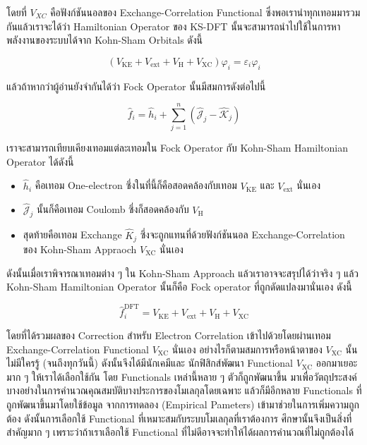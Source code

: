 \noindent โดยที่ $V_{X C}$ คือฟังก์ชันนอลของ Exchange-Correlation Functional ซึ่งพอเรานำทุกเทอมมารวมกันแล้วเราจะได้ว่า
Hamiltonian Operator ของ KS-DFT นั้นจะสามารถนำไปใช้ในการหาพลังงานของระบบได้จาก Kohn-Sham Orbitals ดังนี้

\begin{equation}
    \label{eq:Kohn_Sham_Equation}
    \left(
    V_{\mathrm{KE}}
    + V_{\mathrm{ext}}
    + V_{\mathrm{H}}
    + V_{\mathrm{XC}}
    \right)
    \varphi_i
    =
    \varepsilon_i \varphi_i
\end{equation}

\noindent แล้วถ้าหากว่าผู้อ่านยังจำกันได้ว่า Fock Operator นั้นมีสมการดังต่อไปนี้

\begin{equation}
    \hat{f}_i
    =
    \hat{h}_i + \sum_{j=1}^n \left(\hat{\mathscr{J}}_j - \hat{\mathscr{K}}_j\right)
\end{equation}

\noindent เราจะสามารถเทียบเคียงเทอมแต่ละเทอมใน Fock Operator กับ Kohn-Sham Hamiltonian Operator ได้ดังนี้

\begin{itemize}[topsep=0pt,noitemsep]
    \setlength\itemsep{1em}
    \item $\hat{h}_i$ คือเทอม One-electron ซึ่งในที่นี้ก็คือสอดคล้องกับเทอม $V_{\mathrm{KE}}$ และ $V_{\mathrm{ext}}$ นั่นเอง

    \item $\hat{\mathcal{J}}_j$ นั้นก็คือเทอม Coulomb ซึ่งก็สอดคล้องกับ $V_{\mathrm{H}}$

    \item สุดท้ายคือเทอม Exchange $\hat{K}_j$ ซึ่งจะถูกแทนที่ด้วยฟังก์ชันนอล Exchange-Correlation ของ Kohn-Sham Appraoch
          $V_{\mathrm{XC}}$ นั่นเอง
\end{itemize}

ดังนั้นเมื่อเราพิจารณาเทอมต่าง ๆ ใน Kohn-Sham Approach แล้วเราอาจจะสรุปได้ว่าจริง ๆ แล้ว Kohn-Sham Hamiltonian Operator นั้นก็คือ
Fock operator ที่ถูกดัดแปลงมานั่นเอง ดังนี้

\begin{equation}
    \hat{f}_i^{\mathrm{DFT}}
    =
    V_{\mathrm{KE}}
    + V_{\mathrm{ext}}
    + V_{\mathrm{H}}
    + V_{\mathrm{XC}}
\end{equation}

\noindent โดยที่ได้รวมผลของ Correction สำหรับ Electron Correlation เข้าไปด้วยโดยผ่านเทอม Exchange-Correlation Functional
$V_{\mathrm{XC}}$ นั่นเอง อย่างไรก็ตามสมการหรือหน้าตาของ $V_{\mathrm{XC}}$ นั้นไม่มีใครรู้ (จนถึงทุกวันนี้) ดังนั้นจึงได้มีนักเคมีและ%
นักฟิสิกส์พัฒนา Functional $V_{\mathrm{XC}}$ ออกมาเยอะมาก ๆ ให้เราได้เลือกใช้กัน โดย Functionals เหล่านี้หลาย ๆ ตัวก็ถูกพัฒนาขึ้น%
มาเพื่อวัตถุประสงค์บางอย่างในการคำนวณคุณสมบัติบางประการของโมเลกุลโดยเฉพาะ แล้วก็มีอีกหลาย Functionals ที่ถูกพัฒนาขึ้นมาโดยใช้ข้อมูล%
จากการทดลอง (Empirical Pameters) เข้ามาช่วยในการเพิ่มความถูกต้อง ดังนั้นการเลือกใช้ Functional ที่เหมาะสมกับระบบโมเลกุลที่เราต้องการ%
ศึกษานั้นจึงเป็นสิ่งที่สำคัญมาก ๆ เพราะว่าถ้าเราเลือกใช้ Functional ที่ไม่ดีอาจจะทำให้ได้ผลการคำนวณที่ไม่ถูกต้องได้

